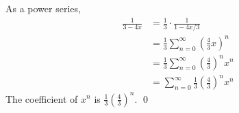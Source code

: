 As a power series,
\begin{align*}
\frac{1}{3 - 4x}
&= \frac{1}{3} \cdot \frac{1}{1 - 4x/3}
\\
&= \frac{1}{3} \sum_{n=0}^\infty \left( \frac{4}{3}x \right)^n
\\
&= \frac{1}{3} \sum_{n=0}^\infty \left( \frac{4}{3} \right)^n x^n
\\
&= \sum_{n=0}^\infty \frac{1}{3} \left( \frac{4}{3} \right)^n x^n
\end{align*}
The coefficient of $x^n$ is
$\displaystyle \frac{1}{3} \left( \frac{4}{3} \right)^n$.
\qed
